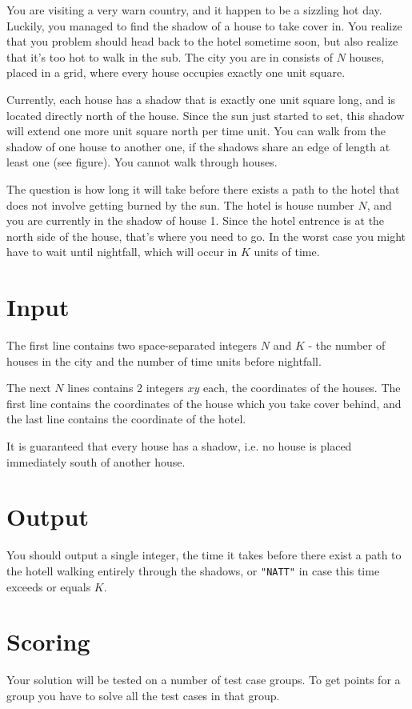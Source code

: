 
You are visiting a very warn country, and it happen to be a sizzling hot day. Luckily, you managed to find the shadow of a house to take cover in. You realize that you problem should head back to the hotel sometime soon, but also realize that it's too hot to walk in the sub. The city you are in consists of $N$ houses, placed in a grid, where every house occupies exactly one unit square.

Currently, each house has a shadow that is exactly one unit square long, and is located directly north of the house. Since the sun just started to set, this shadow will extend one more unit square north per time unit. You can walk from the shadow of one house to another one, if the shadows share an edge of length at least one (see figure). You cannot walk through houses.

The question is how long it will take before there exists a path to the hotel that does not involve getting burned by the sun. The hotel is house number $N$, and you are currently in the shadow of house 1. Since the hotel entrence is at the north side of the house, that's where you need to go. In the worst case you might have to wait until nightfall, which will occur in $K$ units of time.

\section*{Input}
The first line contains two space-separated integers $N$ and $K$ - the number of houses in the city and the number of time units before nightfall.

The next $N$ lines contains 2 integers $x y$ each, the coordinates of the houses. The first line contains the coordinates of the house which you take cover behind, and the last line contains the coordinate of the hotel.

It is guaranteed that every house has a shadow, i.e. no house is placed immediately south of another house.

\section*{Output}
You should output a single integer, the time it takes before there exist a path to the hotell walking entirely through the shadows, or \texttt{"NATT"} in case this time exceeds or equals $K$.

\section*{Scoring}
Your solution will be tested on a number of test case groups. To get points for a group
you have to solve all the test cases in that group.

